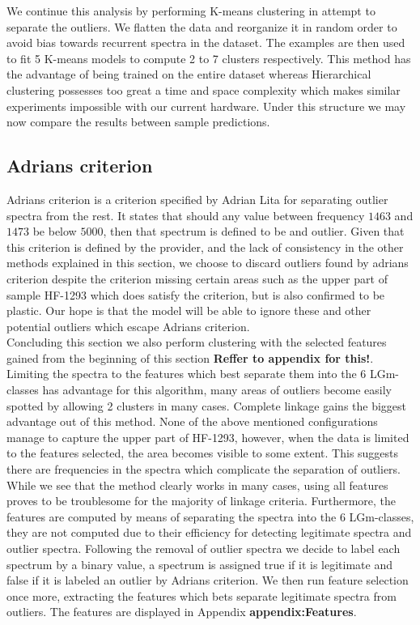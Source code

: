 We continue this analysis by performing K-means clustering in attempt to separate the outliers. We flatten the data and reorganize it in random order to avoid bias towards recurrent spectra in the dataset. The examples are then used to fit 5 K-means models to compute 2 to 7 clusters respectively. This method has the advantage of being trained on the entire dataset whereas Hierarchical clustering possesses too great a time and space complexity which makes similar experiments impossible with our current hardware. Under this structure we may now compare the results between sample predictions. 

\subsection{Adrians criterion}

Adrians criterion is a criterion specified by Adrian Lita for separating outlier spectra from the rest. It states that should any value between frequency $1463$ and $1473$ be below $5000$, then that spectrum is defined to be and outlier. Given that this criterion is defined by the provider, and the lack of consistency in the other methods explained in this section, we choose to discard outliers found by adrians criterion despite the criterion missing certain areas such as the upper part of sample HF-1293 which does satisfy the criterion, but is also confirmed to be plastic. Our hope is that the model will be able to ignore these and other potential outliers which escape Adrians criterion.
\\

Concluding this section we also perform clustering with the selected features gained from the beginning of this section \textbf{Reffer to appendix for this!}. Limiting the spectra to the features which best separate them into the 6 LGm-classes has advantage for this algorithm, many areas of outliers become easily spotted by allowing 2 clusters in many cases. Complete linkage gains the biggest advantage out of this method. None of the above mentioned configurations manage to capture the upper part of HF-1293, however, when the data is limited to the features selected, the area becomes visible to some extent. This suggests there are frequencies in the spectra which complicate the separation of outliers. While we see that the method clearly works in many cases, using all features proves to be troublesome for the majority of linkage criteria. Furthermore, the features are computed by means of separating the spectra into the 6 LGm-classes, they are not computed due to their efficiency for detecting legitimate spectra and outlier spectra. Following the removal of outlier spectra we decide to label each spectrum by a binary value, a spectrum is assigned true if it is legitimate and false if it is labeled an outlier by Adrians criterion. We then run feature selection once more, extracting the features which bets separate legitimate spectra from outliers. The features are displayed in Appendix \textbf{appendix:Features}.